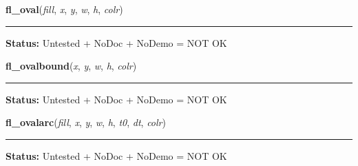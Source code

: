 \hspace{.8\funcindent}\begin{boxedminipage}{\funcwidth}

    \raggedright \textbf{fl\_oval}(\textit{fill}, \textit{x}, \textit{y}, \textit{w}, \textit{h}, \textit{colr})

    \vspace{-1.5ex}

    \rule{\textwidth}{0.5\fboxrule}
\setlength{\parskip}{2ex}
\setlength{\parskip}{1ex}
\textbf{Status:} Untested + NoDoc + NoDemo = NOT OK



    \end{boxedminipage}

    \label{xformslib:library:fl_ovalbound}

    \vspace{0.5ex}

\hspace{.8\funcindent}\begin{boxedminipage}{\funcwidth}

    \raggedright \textbf{fl\_ovalbound}(\textit{x}, \textit{y}, \textit{w}, \textit{h}, \textit{colr})

    \vspace{-1.5ex}

    \rule{\textwidth}{0.5\fboxrule}
\setlength{\parskip}{2ex}
\setlength{\parskip}{1ex}
\textbf{Status:} Untested + NoDoc + NoDemo = NOT OK



    \end{boxedminipage}

    \label{xformslib:library:fl_ovalarc}

    \vspace{0.5ex}

\hspace{.8\funcindent}\begin{boxedminipage}{\funcwidth}

    \raggedright \textbf{fl\_ovalarc}(\textit{fill}, \textit{x}, \textit{y}, \textit{w}, \textit{h}, \textit{t0}, \textit{dt}, \textit{colr})

    \vspace{-1.5ex}

    \rule{\textwidth}{0.5\fboxrule}
\setlength{\parskip}{2ex}
\setlength{\parskip}{1ex}
\textbf{Status:} Untested + NoDoc + NoDemo = NOT OK



    \end{boxedminipage}

